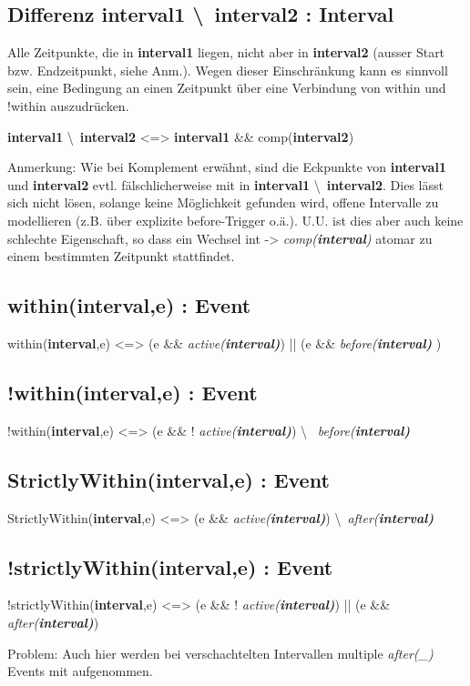 \documentclass[article,colorback,accentcolor=tud4c]{tudreport}
\newcommand{\before}[1]{\textit{ before(#1) }}
\newcommand{\after}[1]{\textit{after(#1)}}
\newcommand{\aktiv}[1]{\textit{active(#1)}}
\newcommand{\Interval}[1]{\textbf{interval#1}}
\newcommand{\comp}[1]{\textit{comp(#1)}}
\begin{document}
\subsection{Differenz \Interval{1} \textbackslash\ \Interval{2} : Interval}
Alle Zeitpunkte, die in \Interval{1} liegen, nicht aber in \Interval{2} (ausser Start bzw.
Endzeitpunkt, siehe Anm.). Wegen dieser Einschränkung kann es sinnvoll sein,
eine Bedingung an einen Zeitpunkt über eine Verbindung von within und !within
auszudrücken.

\Interval{1} \textbackslash\ \Interval{2} <=> \Interval{1} \&\& comp(\Interval{2})

Anmerkung: Wie bei Komplement erwähnt, sind die Eckpunkte von \Interval{1} und \Interval{2}
evtl. fälschlicherweise mit in \Interval{1} \textbackslash\ \Interval{2}. Dies
lässt sich nicht lösen, solange keine Möglichkeit gefunden wird, offene Intervalle zu
modellieren (z.B. über explizite before-Trigger o.ä.). U.U. ist dies aber auch
keine schlechte Eigenschaft, so dass ein Wechsel int -> \comp{\Interval{}}
atomar zu einem bestimmten Zeitpunkt stattfindet.

\subsection{within(\Interval{},e) : Event}
within(\Interval{},e) <=> (e \&\& \aktiv{\Interval}) || (e \&\& \before{\Interval})

\subsection{!within(\Interval{},e) : Event}
!within(\Interval{},e) <=> (e \&\& ! \aktiv{\Interval}) \textbackslash\ \before{\Interval}

\subsection{ StrictlyWithin(\Interval{},e) : Event}
StrictlyWithin(\Interval{},e) <=> (e \&\& \aktiv{\Interval}) \textbackslash\ \after{\Interval}

\subsection{ !strictlyWithin(\Interval{},e) : Event }
!strictlyWithin(\Interval{},e) <=> (e \&\& ! \aktiv{\Interval}) || (e \&\& \after{\Interval})

Problem: Auch hier werden bei verschachtelten Intervallen multiple \after{\_} Events mit aufgenommen.
\end{document}
